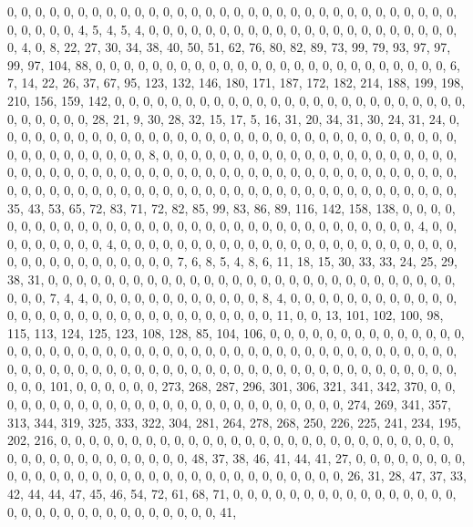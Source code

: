 \documentclass[
]{article}
\begin{document}
0, 0, 0, 0, 0, 0, 0, 0, 0, 0, 0, 0, 0, 0, 0, 0, 0, 0, 0, 0, 0, 0, 0, 0,
0, 0, 0, 0, 0, 0, 0, 0, 0, 0, 0, 0, 0, 4, 5, 4, 5, 4, 0, 0, 0, 0, 0, 0,
0, 0, 0, 0, 0, 0, 0, 0, 0, 0, 0, 0, 0, 0, 0, 0, 0, 4, 0, 8, 22, 27, 30,
34, 38, 40, 50, 51, 62, 76, 80, 82, 89, 73, 99, 79, 93, 97, 97, 99, 97,
104, 88, 0, 0, 0, 0, 0, 0, 0, 0, 0, 0, 0, 0, 0, 0, 0, 0, 0, 0, 0, 0, 0,
0, 0, 0, 0, 6, 7, 14, 22, 26, 37, 67, 95, 123, 132, 146, 180, 171, 187,
172, 182, 214, 188, 199, 198, 210, 156, 159, 142, 0, 0, 0, 0, 0, 0, 0,
0, 0, 0, 0, 0, 0, 0, 0, 0, 0, 0, 0, 0, 0, 0, 0, 0, 0, 0, 0, 0, 0, 0, 0,
28, 21, 9, 30, 28, 32, 15, 17, 5, 16, 31, 20, 34, 31, 30, 24, 31, 24, 0,
0, 0, 0, 0, 0, 0, 0, 0, 0, 0, 0, 0, 0, 0, 0, 0, 0, 0, 0, 0, 0, 0, 0, 0,
0, 0, 0, 0, 0, 0, 0, 0, 0, 0, 0, 0, 0, 0, 0, 0, 0, 0, 8, 0, 0, 0, 0, 0,
0, 0, 0, 0, 0, 0, 0, 0, 0, 0, 0, 0, 0, 0, 0, 0, 0, 0, 0, 0, 0, 0, 0, 0,
0, 0, 0, 0, 0, 0, 0, 0, 0, 0, 0, 0, 0, 0, 0, 0, 0, 0, 0, 0, 0, 0, 0, 0,
0, 0, 0, 0, 0, 0, 0, 0, 0, 0, 0, 0, 0, 0, 0, 0, 0, 0, 0, 0, 0, 0, 0, 0,
0, 0, 0, 0, 0, 0, 0, 0, 35, 43, 53, 65, 72, 83, 71, 72, 82, 85, 99, 83,
86, 89, 116, 142, 158, 138, 0, 0, 0, 0, 0, 0, 0, 0, 0, 0, 0, 0, 0, 0, 0,
0, 0, 0, 0, 0, 0, 0, 0, 0, 0, 0, 0, 0, 0, 0, 0, 0, 0, 4, 0, 0, 0, 0, 0,
0, 0, 0, 0, 4, 0, 0, 0, 0, 0, 0, 0, 0, 0, 0, 0, 0, 0, 0, 0, 0, 0, 0, 0,
0, 0, 0, 0, 0, 0, 0, 0, 0, 0, 0, 0, 0, 0, 0, 0, 0, 7, 6, 8, 5, 4, 8, 6,
11, 18, 15, 30, 33, 33, 24, 25, 29, 38, 31, 0, 0, 0, 0, 0, 0, 0, 0, 0,
0, 0, 0, 0, 0, 0, 0, 0, 0, 0, 0, 0, 0, 0, 0, 0, 0, 0, 0, 0, 0, 0, 0, 7,
4, 4, 0, 0, 0, 0, 0, 0, 0, 0, 0, 0, 0, 0, 8, 4, 0, 0, 0, 0, 0, 0, 0, 0,
0, 0, 0, 0, 0, 0, 0, 0, 0, 0, 0, 0, 0, 0, 0, 0, 0, 0, 0, 0, 0, 0, 0, 11,
0, 0, 13, 101, 102, 100, 98, 115, 113, 124, 125, 123, 108, 128, 85, 104,
106, 0, 0, 0, 0, 0, 0, 0, 0, 0, 0, 0, 0, 0, 0, 0, 0, 0, 0, 0, 0, 0, 0,
0, 0, 0, 0, 0, 0, 0, 0, 0, 0, 0, 0, 0, 0, 0, 0, 0, 0, 0, 0, 0, 0, 0, 0,
0, 0, 0, 0, 0, 0, 0, 0, 0, 0, 0, 0, 0, 0, 0, 0, 0, 0, 0, 0, 0, 0, 0, 0,
0, 0, 0, 0, 0, 0, 0, 0, 0, 0, 0, 101, 0, 0, 0, 0, 0, 0, 273, 268, 287,
296, 301, 306, 321, 341, 342, 370, 0, 0, 0, 0, 0, 0, 0, 0, 0, 0, 0, 0,
0, 0, 0, 0, 0, 0, 0, 0, 0, 0, 0, 0, 0, 0, 274, 269, 341, 357, 313, 344,
319, 325, 333, 322, 304, 281, 264, 278, 268, 250, 226, 225, 241, 234,
195, 202, 216, 0, 0, 0, 0, 0, 0, 0, 0, 0, 0, 0, 0, 0, 0, 0, 0, 0, 0, 0,
0, 0, 0, 0, 0, 0, 0, 0, 0, 0, 0, 0, 0, 0, 0, 0, 0, 0, 0, 0, 0, 0, 48,
37, 38, 46, 41, 44, 41, 27, 0, 0, 0, 0, 0, 0, 0, 0, 0, 0, 0, 0, 0, 0, 0,
0, 0, 0, 0, 0, 0, 0, 0, 0, 0, 0, 0, 0, 0, 0, 0, 0, 26, 31, 28, 47, 37,
33, 42, 44, 44, 47, 45, 46, 54, 72, 61, 68, 71, 0, 0, 0, 0, 0, 0, 0, 0,
0, 0, 0, 0, 0, 0, 0, 0, 0, 0, 0, 0, 0, 0, 0, 0, 0, 0, 0, 0, 0, 0, 0, 41,
\end{document}
